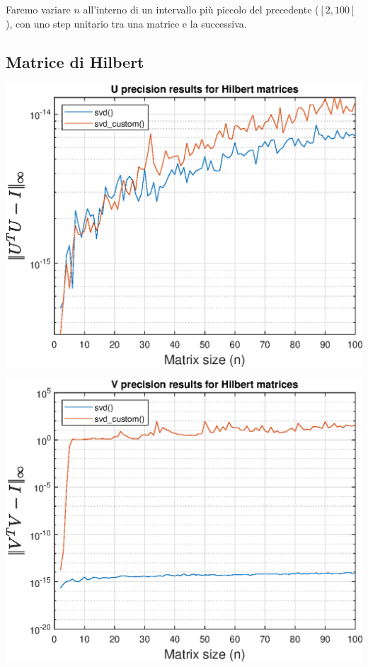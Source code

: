 Faremo variare $n$ all'interno di un intervallo più piccolo del precedente ($[2, 
100]$), con uno step unitario tra una matrice e la successiva.

\newpage
\subsection{Matrice di Hilbert}
\centering
\includegraphics[scale=.9]{imgs/04_-_U_precision_results_for_Hilbert_matrices.eps}
\par \vspace{15pt}
\includegraphics[scale=.9]{imgs/05_-_V_precision_results_for_Hilbert_matrices.eps}

